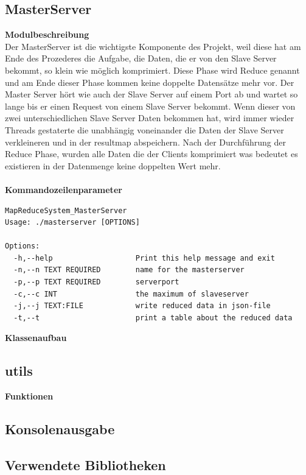 \documentclass[a4paper,12pt]{article}
\begin{document}
\subsection{MasterServer}
\textbf{Modulbeschreibung}\\
Der MasterServer ist die wichtigste Komponente des Projekt, weil diese hat am Ende des Prozederes die Aufgabe, die Daten, die er von den Slave Server bekommt, so klein wie möglich komprimiert. Diese Phase wird Reduce genannt und am Ende dieser Phase kommen keine doppelte Datensätze mehr vor. Der Master Server hört wie auch der Slave Server auf einem Port ab 
und wartet so lange bis er einen Request von einem Slave Server bekommt. Wenn dieser von zwei unterschiedlichen Slave Server Daten bekommen hat, wird immer wieder Threads gestaterte die unabhängig voneinander die Daten der Slave Server verkleineren und in der resultmap abspeichern. Nach der Durchführung der Reduce Phase, wurden alle Daten die der Clients komprimiert was bedeutet es existieren in der Datenmenge
keine doppelten Wert mehr.\\\\
\textbf{Kommandozeilenparameter}\\ 
\begin{verbatim}
MapReduceSystem_MasterServer
Usage: ./masterserver [OPTIONS]

Options:
  -h,--help                   Print this help message and exit
  -n,--n TEXT REQUIRED        name for the masterserver
  -p,--p TEXT REQUIRED        serverport
  -c,--c INT                  the maximum of slaveserver
  -j,--j TEXT:FILE            write reduced data in json-file
  -t,--t                      print a table about the reduced data

\end{verbatim}
\textbf{Klassenaufbau}\\
\subsection{utils}
\textbf{Funktionen}\\
\subsection{Konsolenausgabe}
\newpage
\noindent
\subsection{Verwendete Bibliotheken}
\end{document}
